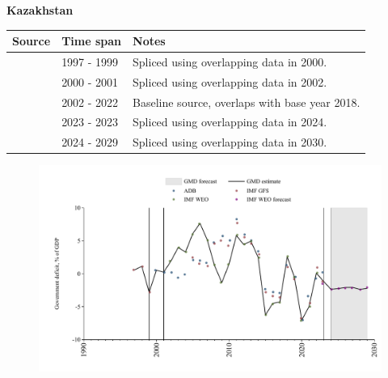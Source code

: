 \documentclass[12pt,a4paper,landscape]{article}
\begin{document}
\begin{adjustbox}{max totalsize={\paperwidth}{\paperheight},center}
\begin{minipage}[t][\textheight][t]{\textwidth}
\vspace*{0.5cm}
{}
\begin{center}
{\Large\bfseries Kazakhstan}
\end{center}
\vspace{0.5cm}
\begin{table}[H]
\centering
\small
\begin{tabular}{|l|l|l|}
\hline
\textbf{Source} & \textbf{Time span} & \textbf{Notes} \\
\hline
\rowcolor{white}\cite{IMF_GFS}& 1997 - 1999 &Spliced using overlapping data in 2000.\\
\rowcolor{lightgray}\cite{ADB}& 2000 - 2001 &Spliced using overlapping data in 2002.\\
\rowcolor{white}\cite{IMF_WEO}& 2002 - 2022 &Baseline source, overlaps with base year 2018.\\
\rowcolor{lightgray}\cite{IMF_GFS}& 2023 - 2023 &Spliced using overlapping data in 2024.\\
\rowcolor{white}\cite{IMF_WEO_forecast}& 2024 - 2029 &Spliced using overlapping data in 2030.\\
\hline
\end{tabular}
\end{table}
\begin{figure}[H]
\centering
\includegraphics[width=\textwidth,height=0.6\textheight,keepaspectratio]{graphs/KAZ_govdef_GDP.pdf}
\end{figure}
\end{minipage}
\end{adjustbox}
\end{document}
